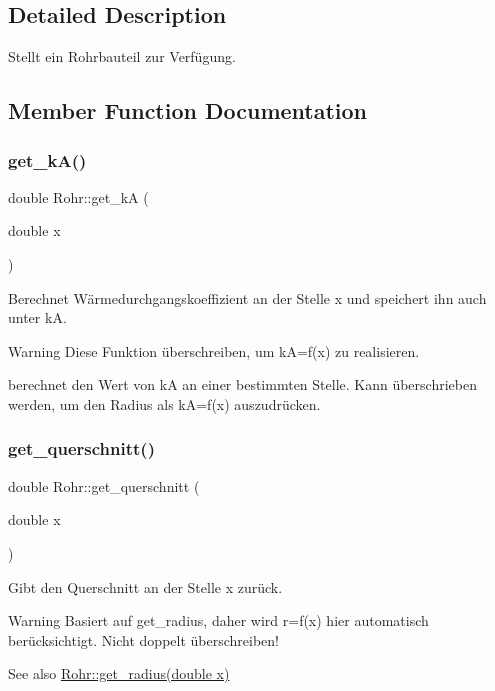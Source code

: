 \subsection{Detailed Description}
Stellt ein Rohrbauteil zur Verfügung. 

\subsection{Member Function Documentation}
\mbox{\label{class_rohr_a07985e6f4a1d9dc8bfcfe2e5cc9f2a60}} 
\subsubsection{\texorpdfstring{get\+\_\+k\+A()}{get\_kA()}}
{\footnotesize\ttfamily double Rohr\+::get\+\_\+kA (\begin{DoxyParamCaption}\item[{double}]{x }\end{DoxyParamCaption})}



Berechnet Wärmedurchgangskoeffizient an der Stelle x und speichert ihn auch unter kA. 

\begin{DoxyWarning}{Warning}
Diese Funktion überschreiben, um kA=f(x) zu realisieren. 
\end{DoxyWarning}
berechnet den Wert von kA an einer bestimmten Stelle. Kann überschrieben werden, um den Radius als kA=f(x) auszudrücken.\mbox{\label{class_rohr_ab8c1e474c5b1510a7c52cb805260ab15}} 
\subsubsection{\texorpdfstring{get\+\_\+querschnitt()}{get\_querschnitt()}}
{\footnotesize\ttfamily double Rohr\+::get\+\_\+querschnitt (\begin{DoxyParamCaption}\item[{double}]{x }\end{DoxyParamCaption})}



Gibt den Querschnitt an der Stelle x zurück. 

\begin{DoxyWarning}{Warning}
Basiert auf get\+\_\+radius, daher wird r=f(x) hier automatisch berücksichtigt. Nicht doppelt überschreiben! 
\end{DoxyWarning}
\begin{DoxySeeAlso}{See also}
\hyperlink{class_rohr_a427e4ad6d350912715bd6796e385eaf3}{Rohr\+::get\+\_\+radius(double x)} 
\end{DoxySeeAlso}
\mbox{\label{class_rohr_a427e4ad6d350912715bd6796e385eaf3}} 
